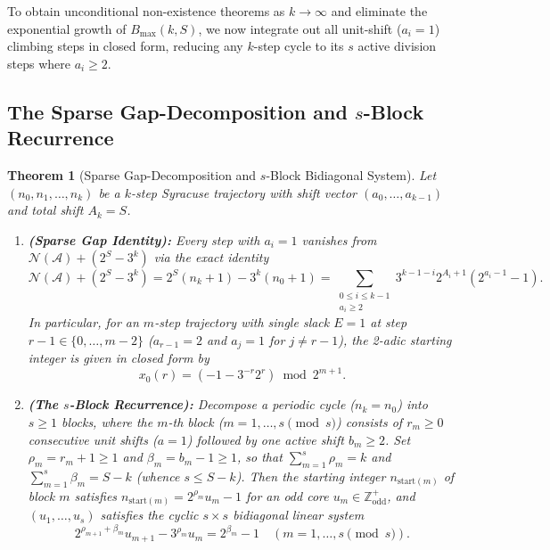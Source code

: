 \documentclass[11pt, a4paper]{amsart}
\newtheorem{theorem}{Theorem}[section]
\theoremstyle{definition}
\newcommand{\Z}{\mathbb{Z}}
\newcommand{\N}{\mathcal{N}}
\newcommand{\A}{\mathcal{A}}
\begin{document}
To obtain unconditional non-existence theorems as $k \to \infty$ and eliminate the exponential growth of $B_{\max}(k, S)$, we now integrate out all unit-shift ($a_i = 1$) climbing steps in closed form, reducing any $k$-step cycle to its $s$ active division steps where $a_i \ge 2$.

\subsection{The Sparse Gap-Decomposition and $s$-Block Recurrence}

\begin{theorem}[Sparse Gap-Decomposition and $s$-Block Bidiagonal System]\label{thm:sparse_block}
Let $(n_0, n_1, \dots, n_k)$ be a $k$-step Syracuse trajectory with shift vector $(a_0, \dots, a_{k-1})$ and total shift $A_k = S$.
\begin{enumerate}
    \item \textbf{(Sparse Gap Identity):} Every step with $a_i = 1$ vanishes from $\N(\A) + (2^S - 3^k)$ via the exact identity
    \begin{equation}\label{eq:sparse_gap}
    \N(\A) + (2^S - 3^k) = 2^S(n_k + 1) - 3^k(n_0 + 1) = \sum_{\substack{0 \le i \le k-1 \\ a_i \ge 2}} 3^{k-1-i} 2^{A_i + 1} \left(2^{a_i - 1} - 1\right).
    \end{equation}
    In particular, for an $m$-step trajectory with single slack $E = 1$ at step $r - 1 \in \{0, \dots, m-2\}$ ($a_{r-1} = 2$ and $a_j = 1$ for $j \ne r-1$), the 2-adic starting integer is given in closed form by
    \begin{equation}\label{eq:single_slack_closed}
    x_0(r) = \left( -1 - 3^{-r} 2^r \right) \bmod 2^{m+1}.
    \end{equation}
    \item \textbf{(The $s$-Block Recurrence):} Decompose a periodic cycle ($n_k = n_0$) into $s \ge 1$ blocks, where the $m$-th block ($m = 1, \dots, s \pmod s$) consists of $r_m \ge 0$ consecutive unit shifts ($a = 1$) followed by one active shift $b_m \ge 2$. Set $\rho_m = r_m + 1 \ge 1$ and $\beta_m = b_m - 1 \ge 1$, so that $\sum_{m=1}^s \rho_m = k$ and $\sum_{m=1}^s \beta_m = S - k$ (whence $s \le S - k$). Then the starting integer $n_{\text{start}(m)}$ of block $m$ satisfies $n_{\text{start}(m)} = 2^{\rho_m} u_m - 1$ for an odd core $u_m \in \Z_{\text{odd}}^+$, and $(u_1, \dots, u_s)$ satisfies the cyclic $s \times s$ bidiagonal linear system
    \begin{equation}\label{eq:block_recurrence}
    2^{\rho_{m+1} + \beta_m} u_{m+1} - 3^{\rho_m} u_m = 2^{\beta_m} - 1 \quad (m = 1, \dots, s \pmod s).
    \end{equation}
\end{enumerate}
\end{theorem}
\end{document}

